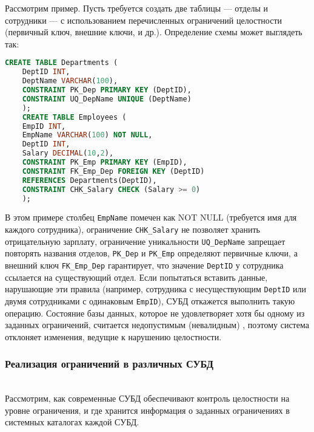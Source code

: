  Рассмотрим пример. Пусть требуется создать две таблицы — отделы и сотрудники — с использованием перечисленных ограничений целостности (первичный ключ, внешние ключи, и др.). Определение схемы может выглядеть так: 
 \begin{lstlisting}[language=SQL]
    CREATE TABLE Departments (
    DeptID INT,
    DeptName VARCHAR(100),
    CONSTRAINT PK_Dep PRIMARY KEY (DeptID),
    CONSTRAINT UQ_DepName UNIQUE (DeptName)
    ); 
    CREATE TABLE Employees (
    EmpID INT,
    EmpName VARCHAR(100) NOT NULL,
    DeptID INT,
    Salary DECIMAL(10,2),
    CONSTRAINT PK_Emp PRIMARY KEY (EmpID),
    CONSTRAINT FK_Emp_Dep FOREIGN KEY (DeptID)
    REFERENCES Departments(DeptID),
    CONSTRAINT CHK_Salary CHECK (Salary >= 0)
    );
 \end{lstlisting}

 В этом примере столбец \texttt{EmpName} помечен как NOT NULL (требуется имя для каждого сотрудника), ограничение \texttt{CHK\_Salary} не позволяет хранить отрицательную зарплату, ограничение уникальности \texttt{UQ\_DepName} запрещает повторять названия отделов, \texttt{PK\_Dep} и \texttt{PK\_Emp} определяют первичные ключи, а внешний ключ \texttt{FK\_Emp\_Dep} гарантирует, что значение \texttt{DeptID} у сотрудника ссылается на существующий отдел. Если попытаться вставить данные, нарушающие эти правила (например, сотрудника с несуществующим \texttt{DeptID} или двумя сотрудниками с одинаковым \texttt{EmpID}), СУБД откажется выполнить такую операцию. Состояние базы данных, которое не удовлетворяет хотя бы одному из заданных ограничений, считается недопустимым (невалидным) \autocite{ElmasriNavathe}, поэтому система отклоняет изменения, ведущие к нарушению целостности.


\subsubsection{Реализация ограничений в различных СУБД} ~\\

 Рассмотрим, как современные СУБД обеспечивают контроль целостности на уровне ограничения, и где хранится информация о заданных ограничениях в системных каталогах каждой СУБД. 

